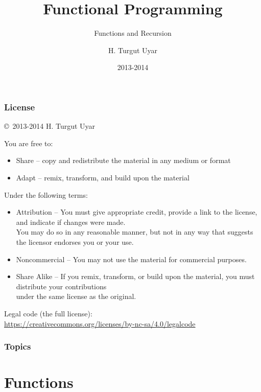 \documentclass[dvipsnames]{beamer}
\title{Functional Programming}
\subtitle{Functions and Recursion}
\author{H. Turgut Uyar}
\date{2013-2014}
\theoremstyle{plain}
\begin{document}

\begin{frame}
  \titlepage
\end{frame}

\begin{frame}
  \frametitle{License}

  \hfill
  \copyright~2013-2014 H. Turgut Uyar

  \vfill
  \begin{tiny}
    You are free to:
    \begin{itemize}
      \item Share -- copy and redistribute the material in any medium or format
      \item Adapt -- remix, transform, and build upon the material
    \end{itemize}

    Under the following terms:
    \begin{itemize}
      \item Attribution -- You must give appropriate credit, provide a link to
        the license, and indicate if changes were made.\\
        You may do so in any reasonable manner, but not in any way
        that suggests the licensor endorses you or your use.

      \item Noncommercial -- You may not use the material for commercial
        purposes.

      \item Share Alike -- If you remix, transform, or build upon the material,
        you must distribute your contributions\\
        under the same license as the original.
    \end{itemize}
  \end{tiny}

  \vfill
  \begin{small}
    Legal code (the full license):\\
    \url{https://creativecommons.org/licenses/by-nc-sa/4.0/legalcode}
  \end{small}
\end{frame}

\begin{frame}
  \frametitle{Topics}
  \tableofcontents
\end{frame}

\section{Functions}
\end{document}

